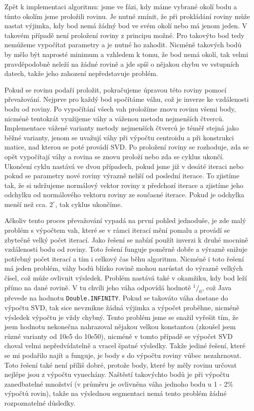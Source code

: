 \documentclass[11pt,twoside,a4paper]{book}
\begin{document}
Zpět k implementaci algoritmu: jsme ve fázi, kdy máme vybrané okolí bodu a tímto okolím jsme proložili rovinu. Je nutné zmínit, že při prokládání roviny může nastat výjimka, kdy bod nemá žádný bod ve svém okolí nebo má jenom jeden. V takovém případě není proložení roviny z principu možné. Pro takovýto bod tedy nemůžeme vypočítat parametry a je nutné ho zahodit. Nicméně takových bodů by mělo být naprosté minimum a vzhledem k tomu, že bod nemá okolí, tak velmi pravděpodobně neleží na žádné rovině a jde spíš o nějakou chybu ve vstupních datech, takže jeho zahození nepředstavuje problém. 

Pokud se rovinu podaří proložit, pokračujeme úpravou této roviny pomocí převažování. Nejprve pro každý bod spočítáme váhu, což je inverze ke vzdálenosti bodu od roviny. Po vypočítání všech vah proložíme znovu rovinu všemi body, nicméně tentokrát využijeme váhy a váženou metodu nejmenších čtverců. Implementace vážené varianty metody nejmenších čtverců je téměř stejná jako běžné varianty, jenom se uvažují váhy při výpočtu centroidu a při konstrukci matice, nad kterou se poté provádí SVD. Po proložení roviny se rozhoduje, zda se opět vypočítají váhy a rovina se znovu proloží nebo zda se cyklus ukončí. Ukončení cyklu nastává ve dvou případech, pokud jsme již v desáté iteraci nebo pokud se parametry nové roviny výrazně neliší od poslední iterace. To zjistíme tak, že si udržujeme normálový vektor roviny z předchozí iterace a zjistíme jeho odchylku od normálového vektoru roviny ze současné iterace. Pokud je odchylka menší než cca. $2^\circ$, tak cyklus ukončíme.

Ačkoliv tento proces převažování vypadá na první pohled jednoduše, je zde malý problém s výpočtem vah, které se v rámci iterací mění pomalu a provádí se zbytečně velký počet iterací. Jako řešení se nabízí použít inverzi k druhé mocnině vzdálenosti bodu od roviny. Toto řešení funguje poměrně dobře a výrazně snižuje potřebný počet iterací a tím i celkový čas běhu algoritmu. Nicméně i toto řešení má jeden problém, váhy bodů blízko rovině mohou narůstat do výrazně velkých čísel, což může ovlivnit výsledek. Problém nastává také v okamžiku, kdy bod leží přímo na dané rovině. V tu chvíli jeho váha odpovídá hodnotě $^1/_0$, což Java převede na hodnotu \verb|Double.INFINITY|. Pokud se takováto váha dostane do výpočtu SVD, tak sice nevznikne žádná výjimka a výpočet proběhne, nicméně výsledek výpočtu je vždy chybný. Tento problém jsme se snažil vyřešit tím, že jsem hodnotu nekonečna nahrazoval nějakou velkou konstantou (zkoušel jsem různé varianty od 10e5 do 10e50), nicméně v tomto případě se výpočet SVD choval velmi nepředvídatelně a vracel špatné výsledky. Takže jediné řešení, které se mi podařilo najít a funguje, je body s  do výpočtu roviny vůbec nezahrnovat. Toto řešení také není příliš dobré, protože body, které by měly rovinu určovat nejlépe jsou z výpočtu vynechány. Naštěstí takovýchto bodů je při výpočtu zanedbatelné množství (v průměru je ovlivněna váha jednoho bodu u 1 - 2\% výpočtů rovin), takže na výslednou segmentaci nemá tento problém žádné rozpoznatelné důsledky.
\end{document}
